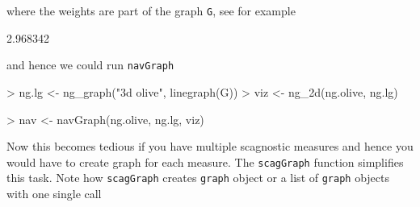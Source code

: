 \documentclass[12pt,oneside,titlepage,letter]{article}
\begin{document}
where the weights are part of the graph \texttt{G}, see for example
\begin{Schunk}
\begin{Soutput}
[1] 2.968342
\end{Soutput}
\end{Schunk}
and hence we could run \texttt{navGraph}
\begin{Schunk}
\begin{Sinput}
> ng.lg <- ng_graph("3d olive", linegraph(G))
> viz <- ng_2d(ng.olive, ng.lg)
\end{Sinput}
\end{Schunk}
\begin{Schunk}
\begin{Sinput}
> nav <- navGraph(ng.olive, ng.lg, viz)
\end{Sinput}
\end{Schunk}

Now this becomes tedious if you have multiple scagnostic measures and hence you would have to create graph for each measure. The \texttt{scagGraph} function simplifies this task. Note how \texttt{scagGraph} creates \texttt{graph} object or a list of \texttt{graph} objects with one single call
\end{document}
